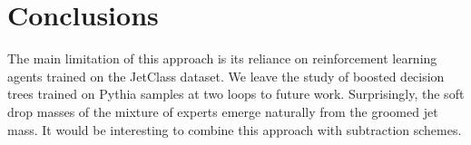 \section{Conclusions}\label{sec:conclusions}

The main limitation of this approach is its reliance on reinforcement
learning agents trained on the JetClass dataset. We leave the study of
boosted decision trees trained on Pythia samples at two loops to future
work. Surprisingly, the soft drop masses of the mixture of experts
emerge naturally from the groomed jet mass. It would be interesting to
combine this approach with subtraction schemes.

